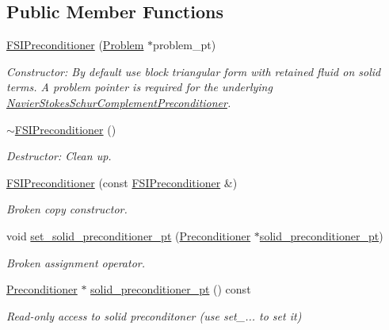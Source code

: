 \subsection*{Public Member Functions}
\begin{DoxyCompactItemize}
\item 
\hyperlink{classoomph_1_1FSIPreconditioner_aee06474cc9aabbde2dacb2cff1317a78}{F\+S\+I\+Preconditioner} (\hyperlink{classoomph_1_1Problem}{Problem} $\ast$problem\+\_\+pt)
\begin{DoxyCompactList}\small\item\em Constructor\+: By default use block triangular form with retained fluid on solid terms. A problem pointer is required for the underlying \hyperlink{classoomph_1_1NavierStokesSchurComplementPreconditioner}{Navier\+Stokes\+Schur\+Complement\+Preconditioner}. \end{DoxyCompactList}\item 
\hyperlink{classoomph_1_1FSIPreconditioner_a787995de6ec09a9113b1b9a8b7c4f9cc}{$\sim$\+F\+S\+I\+Preconditioner} ()
\begin{DoxyCompactList}\small\item\em Destructor\+: Clean up. \end{DoxyCompactList}\item 
\hyperlink{classoomph_1_1FSIPreconditioner_a499de26b5f215957727155cf5f950019}{F\+S\+I\+Preconditioner} (const \hyperlink{classoomph_1_1FSIPreconditioner}{F\+S\+I\+Preconditioner} \&)
\begin{DoxyCompactList}\small\item\em Broken copy constructor. \end{DoxyCompactList}\item 
void \hyperlink{classoomph_1_1FSIPreconditioner_a0f21e38e18521e0946c3f3ec98a85baa}{set\+\_\+solid\+\_\+preconditioner\+\_\+pt} (\hyperlink{classoomph_1_1Preconditioner}{Preconditioner} $\ast$\hyperlink{classoomph_1_1FSIPreconditioner_abc97d84c4d0e7a280947855b7f33c34c}{solid\+\_\+preconditioner\+\_\+pt})
\begin{DoxyCompactList}\small\item\em Broken assignment operator. \end{DoxyCompactList}\item 
\hyperlink{classoomph_1_1Preconditioner}{Preconditioner} $\ast$ \hyperlink{classoomph_1_1FSIPreconditioner_abc97d84c4d0e7a280947855b7f33c34c}{solid\+\_\+preconditioner\+\_\+pt} () const
\begin{DoxyCompactList}\small\item\em Read-\/only access to solid preconditoner (use set\+\_\+... to set it) \end{DoxyCompactList}\item 

\end{DoxyCompactItemize}
